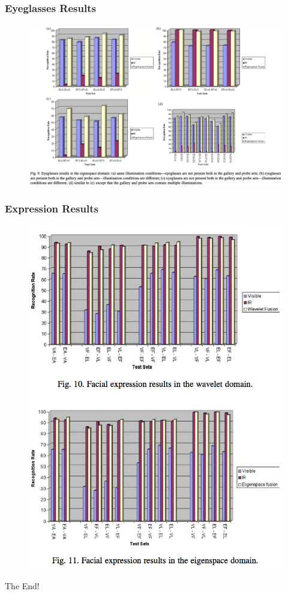 \documentclass{beamer}
\begin{document}
\begin{frame}
\frametitle{Eyeglasses Results}
\begin{figure}
\includegraphics[width=\textwidth]{eyeglassesresults2}
\end{figure}
\end{frame}

\begin{frame}
\frametitle{Expression Results}
\begin{figure}
\includegraphics[height=0.8\textheight]{expressionresults}
\end{figure}
\end{frame}

\begin{frame}
\centerline{The End!}
\end{frame}

\end{document}
